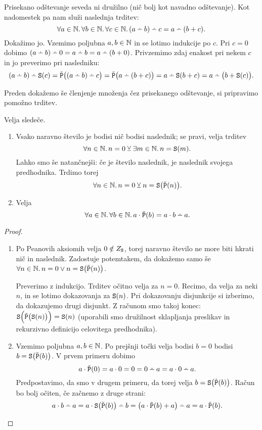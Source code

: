 Prisekano odštevanje seveda ni družilno (nič bolj kot navadno odštevanje). Kot nadomestek pa nam služi naslednja trditev:
\[\all{a \in \NN}\all{b \in \NN}\all{c \in \NN}{(a \monus b) \monus c = a \monus (b + c)}.\]
Dokažimo jo. Vzemimo poljubna $a, b \in \mathbb{N}$ in se lotimo indukcije po $c$. Pri $c = 0$ dobimo $(a \monus b) \monus 0 = a \monus b = a \monus (b + 0)$. Privzemimo zdaj enakost pri nekem $c$ in jo preverimo pri nasledniku:
\[(a \monus b) \monus \suc(c) = \tprd\big((a \monus b) \monus c\big) = \tprd\big(a \monus (b + c)\big) = a \monus \suc(b + c) = a \monus \big(b + \suc(c)\big).\]

Preden dokažemo še členjenje množenja čez prisekanego odštevanje, si pripravimo pomožno trditev.

\begin{lema}\label{lema:nic-ali-naslednik}
Velja sledeče.
\begin{enumerate}
\item
Vsako naravno število je bodisi nič bodisi naslednik; se pravi, velja trditev
\[\forall n \in \mathbb{N} .\,{n = 0 \mathbin{\veebar} \exists m \in \mathbb{N} .\,{n = \mathtt{S}(m)}}.\]
Lahko smo še natančnejši: če je število naslednik, je naslednik svojega predhodnika. Trdimo torej
\[\forall n \in \mathbb{N} .\,{n = 0 \mathbin{\veebar} n = \mathtt{S}\big(\tilde{\mathtt{P}}(n)\big)}.\]
\item
Velja
\[\all{a \in \NN}\all{b \in \NN}{a \cdot \tprd(b) = a \cdot b \monus a}.\]
\end{enumerate}
\end{lema}

\begin{proof}
\begin{enumerate}
\item
Po Peanovih aksiomih velja $0 \notin Z_{\mathtt{S}}$, torej naravno število ne more biti hkrati nič in naslednik. Zadostuje potemtakem, da dokažemo samo še $\forall n \in \mathbb{N} .\,{n = 0 \lor n = \mathtt{S}\big(\tilde{\mathtt{P}}(n)\big)}$.

Preverimo z indukcijo. Trditev očitno velja za $n = 0$. Recimo, da velja za neki $n$, in se lotimo dokazovanja za $\mathtt{S}(n)$. Pri dokazovanju disjunkcije si izberimo, da dokazujemo drugi disjunkt. Z računom smo takoj konec: $\mathtt{S}\Big(\tilde{\mathtt{P}}\big(\mathtt{S}(n)\big)\Big) = \mathtt{S}(n)$ (uporabili smo družilnost sklapljanja preslikav in rekurzivno definicijo celovitega predhodnika).
\item
Vzemimo poljubna $a, b \in \mathbb{N}$. Po prejšnji točki velja bodisi $b = 0$ bodisi $b = \mathtt{S}\big(\tilde{\mathtt{P}}(b)\big)$. V prvem primeru dobimo
\[a \cdot \tprd(0) = a \cdot 0 = 0 = 0 \monus a = a \cdot 0 \monus a.\]
Predpostavimo, da smo v drugem primeru, da torej velja $b = \mathtt{S}\big(\tilde{\mathtt{P}}(b)\big)$. Račun bo bolj očiten, če začnemo z druge strani:
\[a \cdot b \monus a = a \cdot \suc\big(\tprd(b)\big) \monus b = \big(a \cdot \tprd(b) + a\big) \monus a = a \cdot \tprd(b).\]
\end{enumerate}
\end{proof}

